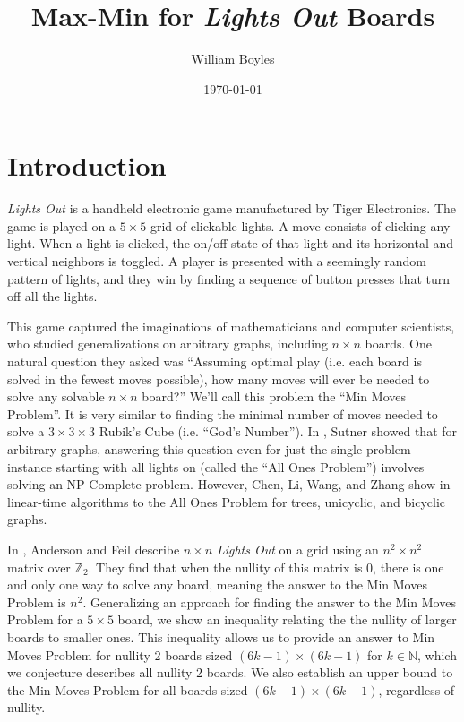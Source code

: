 \documentclass[a4paper]{article}
\newcommand{\Z}{\mathbb{Z}}
\newcommand{\N}{\mathbb{N}}
\begin{document}
	\title{Max-Min for \textit{Lights Out} Boards}
	\author{William Boyles}
	\date{\today}
	\maketitle
	
	\section{Introduction}
	\textit{Lights Out} is a handheld electronic game manufactured by Tiger Electronics.
	The game is played on a $5 \times 5$ grid of clickable lights.
	A move consists of clicking any light.
	When a light is clicked, the on/off state of that light and its horizontal and vertical neighbors is toggled.
	A player is presented with a seemingly random pattern of lights, and they win by finding a sequence of button presses that turn off all the lights.
	
	This game captured the imaginations of mathematicians and computer scientists, who studied generalizations on arbitrary graphs, including $n \times n$ boards.
	One natural question they asked was ``Assuming optimal play (i.e. each board is solved in the fewest moves possible), how many moves will ever be needed to solve any solvable $n \times n$ board?''
	We'll call this problem the ``Min Moves Problem''.
	It is very similar to finding the minimal number of moves needed to solve a $3 \times 3 \times 3$ Rubik's Cube (i.e. ``God's Number'').
	In \cite{Sutner1988}, Sutner showed that for arbitrary graphs, answering this question even for just the single problem instance starting with all lights on (called the ``All Ones Problem'') involves solving an NP-Complete problem.
	However, Chen, Li, Wang, and Zhang show in \cite{CHEN200493} linear-time algorithms to the All Ones Problem for trees, unicyclic, and bicyclic graphs.
	
	In \cite{anderson_feil}, Anderson and Feil describe $n \times n$ \textit{Lights Out} on a grid using an $n^2 \times n^2$ matrix over $\Z_2$.
	They find that when the nullity of this matrix is 0, there is one and only one way to solve any board, meaning the answer to the Min Moves Problem is $n^2$.
	Generalizing an approach for finding the answer to the Min Moves Problem for a $5 \times 5$ board, we show an inequality relating the the nullity of larger boards to smaller ones.
	This inequality allows us to provide an answer to Min Moves Problem for nullity 2 boards sized $(6k - 1) \times (6k - 1)$ for $k \in \N$, which we conjecture describes all nullity 2 boards.
	We also establish an upper bound to the Min Moves Problem for all boards sized $(6k - 1) \times (6k - 1)$, regardless of nullity.
	
\end{document}
